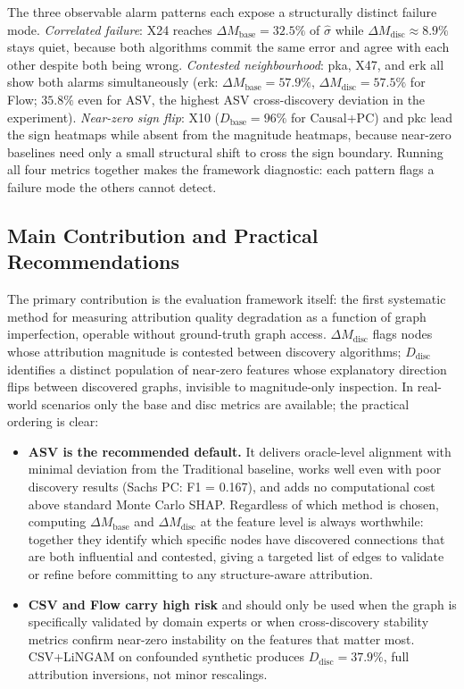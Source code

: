 \documentclass[12pt,letterpaper,twocolumn]{article}
\begin{document}
The three observable alarm patterns each expose a structurally distinct failure mode.
\emph{Correlated failure}: X24 reaches $\Delta M_{\text{base}} = 32.5\%$ of $\hat{\sigma}$
while $\Delta M_{\text{disc}} \approx 8.9\%$ stays quiet, because both algorithms commit
the same error and agree with each other despite both being wrong.
\emph{Contested neighbourhood}: pka, X47, and erk all show both alarms simultaneously
(erk: $\Delta M_{\text{base}} = 57.9\%$, $\Delta M_{\text{disc}} = 57.5\%$ for Flow;
$35.8\%$ even for ASV, the highest ASV cross-discovery deviation in the experiment).
\emph{Near-zero sign flip}: X10 ($D_{\text{base}} = 96\%$ for Causal+PC) and pkc lead
the sign heatmaps while absent from the magnitude heatmaps, because near-zero baselines
need only a small structural shift to cross the sign boundary.
Running all four metrics together makes the framework diagnostic: each pattern flags
a failure mode the others cannot detect.

\subsection{Main Contribution and Practical Recommendations}

The primary contribution is the evaluation framework itself: the first systematic
method for measuring attribution quality degradation as a function of graph imperfection,
operable without ground-truth graph access. $\Delta M_{\text{disc}}$ flags nodes whose
attribution magnitude is contested between discovery algorithms; $D_{\text{disc}}$
identifies a distinct population of near-zero features whose explanatory direction flips
between discovered graphs, invisible to magnitude-only inspection. In real-world
scenarios only the base and disc metrics are available; the practical ordering is clear:

\begin{itemize}[nosep]
  \item \textbf{ASV is the recommended default.} It delivers oracle-level alignment with
  minimal deviation from the Traditional baseline, works well even with poor discovery
  results (Sachs PC: F1 = 0.167), and adds no computational cost above standard Monte
  Carlo SHAP. Regardless of which method is chosen, computing $\Delta M_{\text{base}}$
  and $\Delta M_{\text{disc}}$ at the feature level is always worthwhile: together they
  identify which specific nodes have discovered connections that are both influential and
  contested, giving a targeted list of edges to validate or refine before committing to
  any structure-aware attribution.
  \item \textbf{CSV and Flow carry high risk} and should only be used when the graph
  is specifically validated by domain experts or when cross-discovery stability metrics
  confirm near-zero instability on the features that matter most. CSV+LiNGAM on
  confounded synthetic produces $D_{\text{disc}} = 37.9\%$, full attribution inversions,
  not minor rescalings.
\end{itemize}
\end{document}
